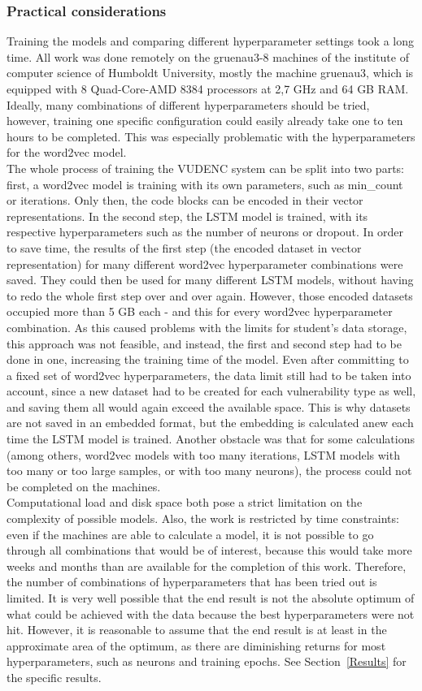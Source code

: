 \documentclass[
a4paper,
pagesize,
pdftex,
12pt,
ngerman,
fleqn,
final,
]{scrartcl}
\begin{document}
	\subsubsection{Practical considerations}
	Training the models and comparing different hyperparameter settings took a long time. All work was done remotely on the gruenau3-8 machines of the institute of computer science of Humboldt University, mostly the machine gruenau3, which is equipped with 8 Quad-Core-AMD 8384 processors at 2,7 GHz and 64 GB RAM. Ideally, many combinations of different hyperparameters should be tried, however, training one specific configuration could easily already take one to ten hours to be completed. This was especially problematic with the hyperparameters for the word2vec model.\\
	The whole process of training the VUDENC system can be split into two parts: first, a word2vec model is training with its own parameters, such as min\_count or iterations. Only then, the code blocks can be encoded in their vector representations. In the second step, the LSTM model is trained, with its respective hyperparameters such as the number of neurons or dropout. In order to save time, the results of the first step (the encoded dataset in vector representation) for many different word2vec hyperparameter combinations were saved. They could then be used for many different LSTM models, without having to redo the whole first step over and over again. However, those encoded datasets occupied more than 5 GB each - and this for every word2vec hyperparameter combination. As this caused problems with the limits for student's data storage, this approach was not feasible, and instead, the first and second step had to be done in one, increasing the training time of the model. Even after committing to a fixed set of word2vec hyperparameters, the data limit still had to be taken into account, since a new dataset had to be created for each vulnerability type as well, and saving them all would again exceed the available space. This is why datasets are not saved in an embedded format, but the embedding is calculated anew each time the LSTM model is trained. Another obstacle was that for some calculations (among others, word2vec models with too many iterations, LSTM models with too many or too large samples, or with too many neurons), the process could not be completed on the machines.\\
	Computational load and disk space both pose a strict limitation on the complexity of possible models. Also, the work is restricted by time constraints: even if the machines are able to calculate a model, it is not possible to go through all combinations that would be of interest, because this would take more weeks and months than are available for the completion of this work. Therefore, the number of combinations of hyperparameters that has been tried out is limited. It is very well possible that the end result is not the absolute optimum of what could be achieved with the data because the best hyperparameters were not hit. However, it is reasonable to assume that the end result is at least in the approximate area of the optimum, as there are diminishing returns for most hyperparameters, such as neurons and training epochs. See Section~\ref{Results} for the specific results. 
		
\end{document}

